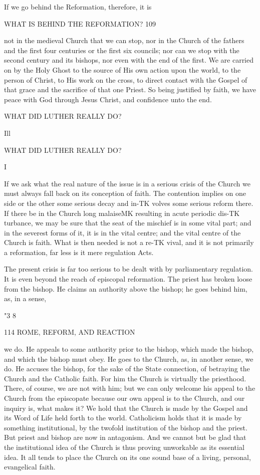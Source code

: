\documentclass[12pt,a5paper,oneside]{book}
\begin{document}
If we go behind the Reformation, therefore, it is 



WHAT IS BEHIND THE REFORMATION? 109 

not in the medieval Church that we can stop, nor in 
the Church of the fathers and the first four centuries 
or the first six councils; nor can we stop with the 
second century and its bishops, nor even with the end 
of the first. We are carried on by the Holy Ghost 
to the source of His own action upon the world, to 
the person of Christ, to His work on the cross, to 
direct contact with the Gospel of that grace and the 
sacrifice of that one Priest. So being justified by faith, 
we have peace with God through Jesus Christ, and 
confidence unto the end. 



WHAT DID LUTHER REALLY DO? 



Ill 

WHAT DID LUTHER REALLY DO? 

I 

If we ask what the real nature of the issue is in a 
serious crisis of the Church we must always fall back 
on its conception of faith. The contention implies 
on one side or the other some serious decay and in-TK
volves some serious reform there. If there be in the 
Church long malaiseMK resulting in acute periodic dis-TK
turbance, we may be sure that the seat of the mischief 
is in some vital part; and in the severest forms of it, 
it is in the vital centre; and the vital centre of the 
Church is faith. What is then needed is not a re-TK
vival, and it is not primarily a reformation, far less 
is it mere regulation Acts. 

The present crisis is far too serious to be dealt with 
by parliamentary regulation. It is even beyond the 
reach of episcopal reformation. The priest has 
broken loose from the bishop. He claims an authority 
above the bishop; he goes behind him, as, in a sense, 

"3 8 



114 ROME, REFORM, AND REACTION 

we do. He appeals to some authority prior to the 
bishop, which made the bishop, and which the bishop 
must obey. He goes to the Church, as, in another 
sense, we do. He accuses the bishop, for the sake of 
the State connection, of betraying the Church and the 
Catholic faith. For him the Church is virtually the 
priesthood. There, of course, we are not with him; 
but we can only welcome his appeal to the Church 
from the episcopate because our own appeal is to the 
Church, and our inquiry is, what makes it? We 
hold that the Church is made by the Gospel and its 
Word of Life held forth to the world. Catholicism 
holds that it is made by something institutional, by the 
twofold institution of the bishop and the priest. But 
priest and bishop are now in antagonism. And we 
cannot but be glad that the institutional idea of the 
Church is thus proving unworkable as its essential 
idea. It all tends to place the Church on its one 
sound base of a living, personal, evangelical faith. 
\end{document}
